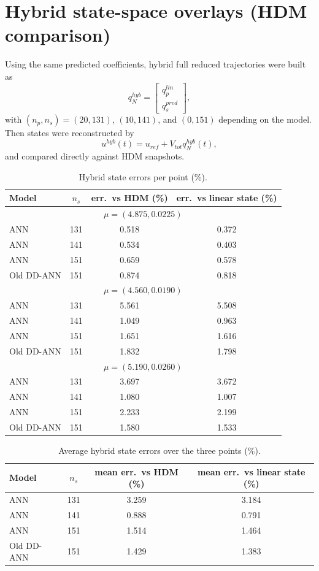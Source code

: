 \documentclass[11pt]{article}
\begin{document}
\section*{Hybrid state-space overlays (HDM comparison)}
Using the same predicted coefficients, hybrid full reduced trajectories were built as
\[
q_N^{hyb}=
\begin{bmatrix}
q_p^{lin}\\ q_s^{pred}
\end{bmatrix},
\]
with $(n_p,n_s)=(20,131)$, $(10,141)$, and $(0,151)$ depending on the model.
Then states were reconstructed by
\[
u^{hyb}(t)=u_{ref}+V_{tot}q_N^{hyb}(t),
\]
and compared directly against HDM snapshots.

\begin{table}[H]
\centering
\caption{Hybrid state errors per point (\%).}
\begin{tabular}{lccc}
\toprule
Model & $n_s$ & err.\ vs HDM (\%) & err.\ vs linear state (\%) \\
\midrule
\multicolumn{4}{c}{\(\mu=(4.875,0.0225)\)} \\
\midrule
ANN & 131 & 0.518 & 0.372 \\
ANN & 141 & 0.534 & 0.403 \\
ANN & 151 & 0.659 & 0.578 \\
Old DD-ANN & 151 & 0.874 & 0.818 \\
\midrule
\multicolumn{4}{c}{\(\mu=(4.560,0.0190)\)} \\
\midrule
ANN & 131 & 5.561 & 5.508 \\
ANN & 141 & 1.049 & 0.963 \\
ANN & 151 & 1.651 & 1.616 \\
Old DD-ANN & 151 & 1.832 & 1.798 \\
\midrule
\multicolumn{4}{c}{\(\mu=(5.190,0.0260)\)} \\
\midrule
ANN & 131 & 3.697 & 3.672 \\
ANN & 141 & 1.080 & 1.007 \\
ANN & 151 & 2.233 & 2.199 \\
Old DD-ANN & 151 & 1.580 & 1.533 \\
\midrule
\bottomrule
\end{tabular}
\end{table}

\begin{table}[H]
\centering
\caption{Average hybrid state errors over the three points (\%).}
\begin{tabular}{lccc}
\toprule
Model & $n_s$ & mean err.\ vs HDM (\%) & mean err.\ vs linear state (\%) \\
\midrule
ANN & 131 & 3.259 & 3.184 \\
ANN & 141 & 0.888 & 0.791 \\
ANN & 151 & 1.514 & 1.464 \\
Old DD-ANN & 151 & 1.429 & 1.383 \\
\bottomrule
\end{tabular}
\end{table}
\end{document}
